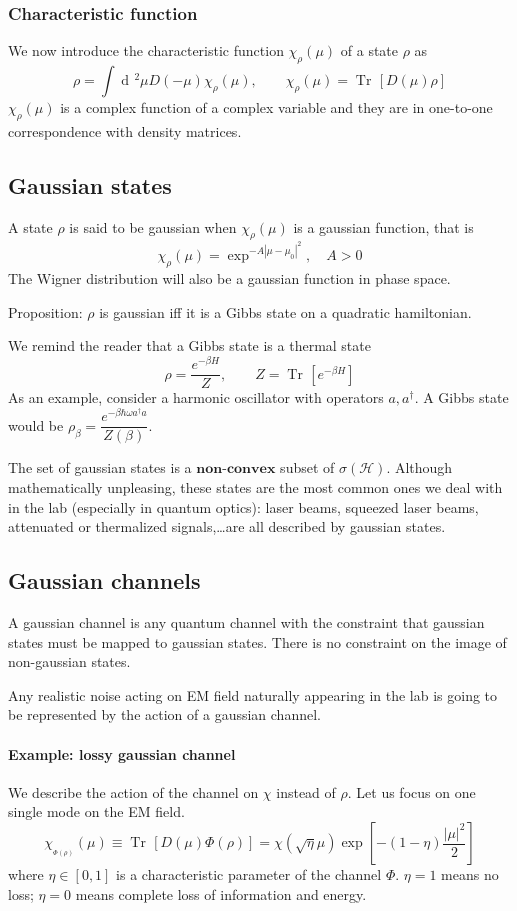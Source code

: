 \documentclass[a4paper, 11pt]{article}
\newcommand{\dd}{\mathop{\mathrm{d}\!}{}}
\newcommand{\Tr}{\mathop{\mathrm{Tr}\!}{}}
\newcommand{\HH}{\mathcal{H}}
\begin{document}
	\subsubsection{Characteristic function} We now introduce the characteristic function $\chi_\rho(\mu)$ of a state $\rho$ as
	\[ \rho = \int \dd^2\mu D(-\mu) \chi_\rho(\mu),\qquad \chi_\rho(\mu) = \Tr\left[D(\mu)\rho\right] \]
	$\chi_\rho(\mu)$ is a complex function of a complex variable and they are in one-to-one correspondence with density matrices.
	
	\subsection{Gaussian states} A state $\rho$ is said to be gaussian when $\chi_\rho(\mu)$ is a gaussian function, that is
	\[ \chi_\rho(\mu) = \exp^{-A|\mu-\mu_0|^2},\quad A> 0 \]
	The Wigner distribution will also be a gaussian function in phase space.
	
	Proposition: $\rho$ is gaussian iff it is a Gibbs state on a quadratic hamiltonian.
	
	\noindent We remind the reader that a Gibbs state is a thermal state
	\[ \rho = \dfrac{e^{-\beta H}}{Z},\qquad Z = \Tr\left[ e^{-\beta H} \right] \]
	As an example, consider a harmonic oscillator with operators $a,a^\dagger$. A Gibbs state would be $\rho_\beta = \dfrac{e^{-\beta\hbar\omega a^\dagger a}}{Z(\beta)}$.
	
	The set of gaussian states is a $\mathbf{non}$-$\mathbf{convex}$ subset of $\sigma(\HH)$. Although mathematically unpleasing, these states are the most common ones we deal with in the lab (especially in quantum optics): laser beams, squeezed laser beams, attenuated or thermalized signals,\dots are all described by gaussian states.
	
	\subsection{Gaussian channels}
	A gaussian channel is any quantum channel with the constraint that gaussian states must be mapped to gaussian states. There is no constraint on the image of non-gaussian states.
	
	Any realistic noise acting on EM field naturally appearing in the lab is going to be represented by the action of a gaussian channel.
	
	\paragraph{Example: lossy gaussian channel} We describe the action of the channel on $\chi$ instead of $\rho$.
	Let us focus on one single mode on the EM field.
	\[ \chi_{_{\Phi(\rho)}}(\mu) \equiv \Tr\left[ D(\mu) \Phi(\rho) \right] = \chi(\sqrt{\eta}\mu) \exp\left[-(1-\eta) \frac{|\mu|^2}{2} \right] \]
	where $\eta\in[0,1]$ is a characteristic parameter of the channel $\Phi$. $\eta=1$ means no loss; $\eta=0$ means complete loss of information and energy.
	
\end{document}
